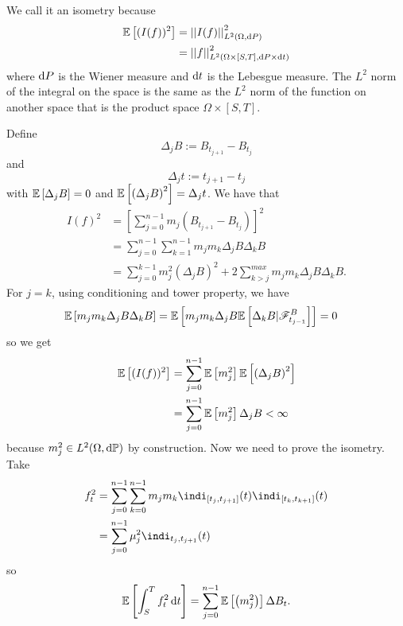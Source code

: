 \documentclass[12pt]{report}
\begin{document}
We call it an isometry because
\begin{align*}
	\mathbb{E}\left[(I(f))^{2}\right]&=\left|\left|I(f)\right|\right|^{2}_{L^{2}(\Omega,\mathop{}\!\mathrm{d} P)}\\
	&=\left|\left|f\right|\right|^{2}_{L^{2}(\Omega\times[S,T],\mathop{}\!\mathrm{d} P\times\mathop{}\!\mathrm{d} t)}
\end{align*}
where $\mathop{}\!\mathrm{d} P$ is the Wiener measure and $\mathop{}\!\mathrm{d} t$ is the Lebesgue measure. The $L^{2}$ norm of the integral on the space is the same as the $L^{2}$ norm of the function on another space that is the product space $\Omega\times[S,T]$.
\begin{fancyproof}
	Define
	\begin{equation*}
		\Delta_{j}B:=B_{t_{j+1}}-B_{t_{j}}
	\end{equation*}
	and \begin{equation*}
		\Delta_{j}t:=t_{j+1}-t_{j}
	\end{equation*}
	with $\mathbb{E}\left[\Delta_{j}B\right]=0$ and $\mathbb{E}\left[\left(\Delta_{j}B\right)^{2}\right]=\Delta_{j}t$. We have that
	\begin{align*}
		I(f)^{2}&=\left[\sum_{j=0}^{n-1}m_{j}(B_{t_{j+1}}-B_{t_{j}})\right]^{2}\\
		&=\sum_{j=0}^{n-1}\sum_{k=1}^{n-1}m_{j}m_{k}\Delta_{j}B\Delta_{k}B\\
		&=\sum_{j=0}^{k-1}m^{2}_{j}\left(\Delta_{j}B\right)^{2}+2\sum_{k>j}^{max}m_{j}m_{k}\Delta_{j}B\Delta_{k}B.
	\end{align*}
	For $j=k$, using conditioning and tower property, we have
	\begin{align*}
		\mathbb{E}\left[m_{j}m_{k}\Delta_{j}B\Delta_{k}B\right]&=\mathbb{E}\left[m_{j}m_{k}\Delta_{j}B\mathbb{E}\left[\Delta_{k}B|\mathscr{F}^{B}_{t_{j-1}}\right]\right]=0
	\end{align*}
	so we get
	\begin{align*}
		\mathbb{E}\left[(I(f))^{2}\right]&=\sum_{j=0}^{n-1}\mathbb{E}\left[m_{j}^{2}\right]\mathbb{E}\left[\left(\Delta_{j}B\right)^{2}\right]\\
		&=\sum_{j=0}^{n-1}\mathbb{E}\left[m_{j}^{2}\right]\Delta_{j}B<\infty
	\end{align*}
	because $m^{2}_{j}\in L^{2}(\Omega,\mathop{}\!\mathrm{d}\mathbb{P})$ by construction. Now we need to prove the isometry. Take
	\begin{align*}
		f^{2}_{t}&=\sum_{j=0}^{n-1}\sum_{k=0}^{n-1}m_{j}m_{k}\indi_{[t_{j},t_{j+1}]}(t)\indi_{[t_{k},t_{k+1}]}(t)\\
		&=\sum_{j=0}^{n-1}\mu_{j}^{2}\indi_{t_{j},t_{j+1}}(t)
	\end{align*}
	so 
	\begin{equation*}
		\mathbb{E}\left[\int_{S}^{T}f_{t}^{2}\mathop{}\!\mathrm{d} t\right]=\sum_{j=0}^{n-1}\mathbb{E}\left[\left(m^{2}_{j}\right)\right]\Delta B_{t}.
	\end{equation*}
\end{fancyproof}
\end{document}
